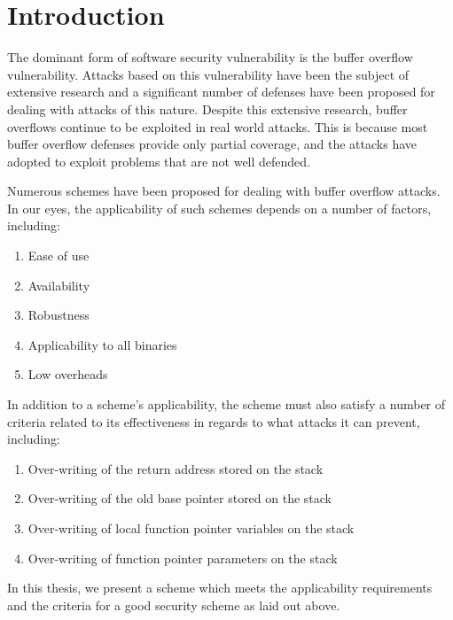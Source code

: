 
\renewcommand{\thechapter}{1}

\chapter{Introduction}

The dominant form of software security vulnerability is the buffer overflow vulnerability. Attacks
based on this vulnerability have been the subject of extensive research and a significant number of
defenses have been proposed for dealing with attacks of this nature. Despite this extensive
research, buffer overflows continue to be exploited in real world attacks. This is because most
buffer overflow defenses provide only partial coverage, and the attacks have adopted to exploit
problems that are not well defended.

Numerous schemes have been proposed for dealing with buffer overflow attacks. In our eyes, the
applicability of such schemes depends on a number of factors, including:

\begin{enumerate}
 \item Ease of use
 \item Availability
 \item Robustness
 \item Applicability to all binaries
 \item Low overheads
\end{enumerate}

In addition to a scheme's applicability, the scheme must also satisfy a number of criteria related
to its effectiveness in regards to what attacks it can prevent, including:

\begin{enumerate}
 \item Over-writing of the return address stored on the stack
 \item Over-writing of the old base pointer stored on the stack
 \item Over-writing of local function pointer variables on the stack
 \item Over-writing of function pointer parameters on the stack
\end{enumerate}

In this thesis, we present a scheme which meets the applicability requirements and the criteria for
a good security scheme as laid out above.  
